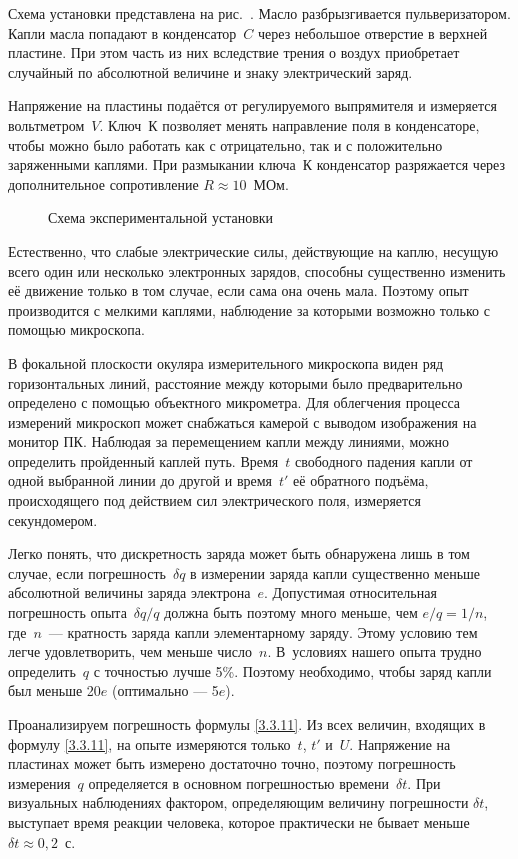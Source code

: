 \experiment Схема установки представлена на рис.~. Масло
разбрызгивается пульверизатором. Капли масла попадают в конденсатор~$C$ через
небольшое отверстие в верхней пластине. При этом часть из них вследствие трения
о воздух приобретает случайный по абсолютной величине и знаку электрический
заряд.

Напряжение на пластины подаётся от регулируемого выпрямителя и измеряется
вольтметром~$V$. Ключ~К позволяет менять направление поля в конденсаторе,
чтобы можно было работать  как с отрицательно, так и с положительно заряженными
каплями. При размыкании ключа~К конденсатор разряжается через дополнительное
сопротивление $R\approx 10$~МОм.
\begin{figure}[h!]
    \centering
	\caption{Схема экспериментальной установки}
\end{figure}

Естественно, что слабые электрические силы, действующие на каплю, несущую всего
один или несколько электронных зарядов, способны существенно изменить её
движение только в том случае, если сама она очень мала. Поэтому опыт производится
с мелкими каплями, наблюдение за которыми возможно только с помощью
микроскопа.

В фокальной плоскости окуляра измерительного микроскопа виден ряд
горизонтальных линий, расстояние между которыми было предварительно определено с
помощью объектного микрометра. Для облегчения процесса измерений микроскоп может
снабжаться камерой с выводом изображения на монитор ПК. Наблюдая за перемещением
капли между линиями, можно определить пройденный каплей путь. Время~$t$
свободного падения капли от одной выбранной линии до другой и время~$t'$ её
обратного подъёма, происходящего под действием сил электрического поля,
измеряется секундомером.

Легко понять, что дискретность заряда может быть обнаружена лишь
в том случае, если погрешность~$\delta q$ в измерении заряда капли 
существенно меньше абсолютной величины заряда электрона~$e$. 
Допустимая относительная погрешность опыта~$\delta q/q$ должна быть 
поэтому много меньше, чем $e/q=1/n$, где~$n$~--- кратность заряда
капли элементарному заряду. Этому условию тем легче
удовлетворить, чем меньше число~$n$. 
В~условиях нашего опыта трудно определить~$q$ с точностью лучше 5\%.
Поэтому необходимо, чтобы заряд капли был меньше 20$e$
(оптимально --- 5$e$).

Проанализируем погрешность формулы \eqref{3.3.11}.
Из всех величин, входящих в формулу \eqref{3.3.11}, 
на опыте измеряются только~$t$, $t'$ и~$U$. 
Напряжение на пластинах может быть измерено достаточно
точно, поэтому погрешность измерения~$q$ определяется в основном 
погрешностью времени~$\delta t$. При визуальных наблюдениях
фактором, определяющим величину погрешности $\delta t$, 
выступает время реакции человека, которое практически 
не бывает меньше $\delta t \approx 0,2$~с.

